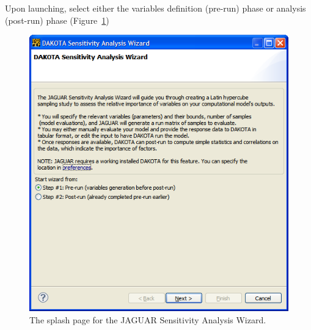 Upon launching, select either the variables definition (pre-run) phase
or analysis (post-run) phase (Figure~\ref{fig:input:jaguar_sa_wizard})
\begin{figure}
  \centering
  \includegraphics[scale=0.5]{images/jaguar_sa_wizard}
  \caption{The splash page for the JAGUAR Sensitivity Analysis
  Wizard.}
  \label{fig:input:jaguar_sa_wizard}
\end{figure}

